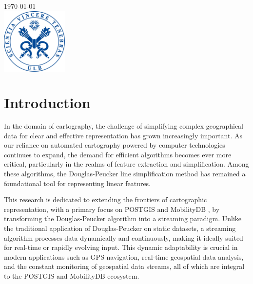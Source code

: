 \documentclass[twoside,12pt, a4paper]{report}
\begin{document}
\begin{titlepage}

{\large \today}\\[1cm] %


\includegraphics[width=3.3cm, height=3.3cm]{sceau-a-quadri.jpg}%
 

\end{titlepage}

\tableofcontents
\newpage

\chapter{Introduction}
In the domain of cartography, the challenge of simplifying complex geographical data for clear and effective representation has grown increasingly important. As our reliance on automated cartography powered by computer technologies continues to expand, the demand for efficient algorithms becomes ever more critical, particularly in the realms of feature extraction and simplification. Among these algorithms, the Douglas-Peucker line simplification method has remained a foundational tool for representing linear features.

This research is dedicated to extending the frontiers of cartographic representation, with a primary focus on POSTGIS and MobilityDB \cite{zimanyi2019mobilitydb}, by transforming the Douglas-Peucker algorithm into a streaming paradigm. Unlike the traditional application of Douglas-Peucker on static datasets, a streaming algorithm processes data dynamically and continuously, making it ideally suited for real-time or rapidly evolving input. This dynamic adaptability is crucial in modern applications such as GPS navigation, real-time geospatial data analysis, and the constant monitoring of geospatial data streams, all of which are integral to the POSTGIS and MobilityDB ecosystem.
\end{document}

